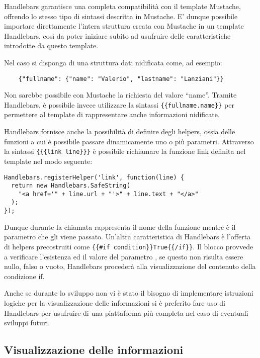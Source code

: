 Handlebars garantisce una completa compatibilità con il template Mustache, offrendo lo stesso tipo di sintassi descritta in Mustache. E' dunque possibile importare direttamente l'intera struttura creata con Mustache in un template Handlebars, così da poter iniziare subito ad usufruire delle caratteristiche introdotte da questo template.

Nel caso si disponga di una struttura dati nidificata come, ad esempio:
\begin{lstlisting}
    {"fullname": {"name": "Valerio", "lastname": "Lanziani"}}
\end{lstlisting}
Non sarebbe possibile con Mustache la richiesta del valore ``name''. Tramite Handlebars, è possibile invece utilizzare la sintassi \lstinline!{{fullname.name}}! per permettere al template di rappresentare anche informazioni nidificate.

Handlebars fornisce anche la possibilità di definire degli helpers, ossia delle funzioni a cui è possibile passare dinamicamente uno o più parametri. Attraverso la sintassi \lstinline!{{{link line}}}! è possibile richiamare la funzione link definita nel template nel modo seguente:
\begin{lstlisting}
Handlebars.registerHelper('link', function(line) {
  return new Handlebars.SafeString(
    "<a href='" + line.url + "'>" + line.text + "</a>"
  );
});
\end{lstlisting}
Dunque durante la chiamata  rappresenta il nome della funzione mentre  è il parametro che gli viene passato.
Un'altra caratteristica di Handlebars è l'offerta di helpers precostruiti come \lstinline!{{#if condition}}True{{/if}}!. Il blocco provvede a verificare l'esistenza ed il valore del parametro , se questo non risulta essere nullo, falso o vuoto, Handlebars procederà alla visualizzazione del contenuto della condizione if.

Anche se durante lo sviluppo non vi è stato il bisogno di implementare istruzioni logiche per la visualizzazione delle informazioni si è preferito fare uso di Handlebars per usufruire di una piattaforma più completa nel caso di eventuali sviluppi futuri.


\subsection{Visualizzazione delle informazioni} %
\label{sub:visualizzazione_delle_informazioni}

